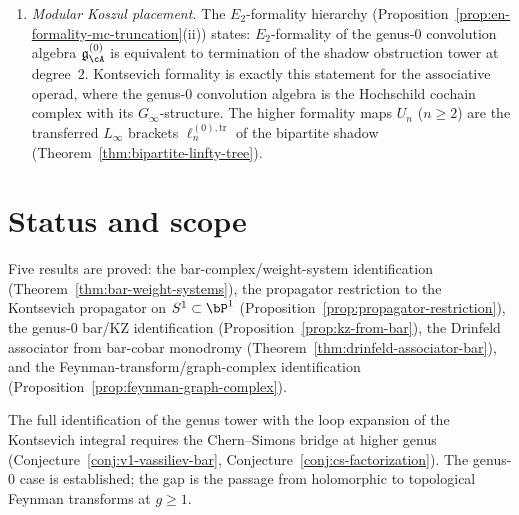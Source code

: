\begin{construction}
\begin{enumerate}[label=\textup{(\roman*)}]
 cancellation that gives $d^2 = 0$ for the bar complex.
\item \emph{Modular Koszul placement.}
 The $E_2$-formality hierarchy
 (Proposition~\ref{prop:en-formality-mc-truncation}\textup{(ii)})
 states: $E_2$-formality of the genus-$0$ convolution algebra
 $\mathfrak{g}^{(0)}_\cA$ is equivalent to termination of the
 shadow obstruction tower at degree~$2$. Kontsevich formality is exactly
 this statement for the associative operad, where the genus-$0$
 convolution algebra is the Hochschild cochain complex with its
 $G_\infty$-structure. The higher formality maps $U_n$
 ($n \geq 2$) are the transferred $L_\infty$ brackets
 $\ell_n^{(0),\mathrm{tr}}$ of the bipartite shadow
 (Theorem~\ref{thm:bipartite-linfty-tree}).
\end{enumerate}
\end{construction}

\section{Status and scope}
\label{sec:kontsevich-summary}

Five results are proved: the bar-complex/weight-system
identification (Theorem~\ref{thm:bar-weight-systems}), the
propagator restriction to the Kontsevich propagator on
$S^1 \subset \bP^1$
(Proposition~\ref{prop:propagator-restriction}), the genus-$0$
bar/KZ identification (Proposition~\ref{prop:kz-from-bar}), the
Drinfeld associator from bar-cobar monodromy
(Theorem~\ref{thm:drinfeld-associator-bar}), and the
Feynman-transform/graph-complex identification
(Proposition~\ref{prop:feynman-graph-complex}).

The full identification of the genus tower with the loop expansion
of the Kontsevich integral requires the Chern--Simons bridge at
higher genus (Conjecture~\ref{conj:v1-vassiliev-bar},
Conjecture~\ref{conj:cs-factorization}). The genus-$0$ case is
established; the gap is the passage from holomorphic to topological
Feynman transforms at $g \geq 1$.
